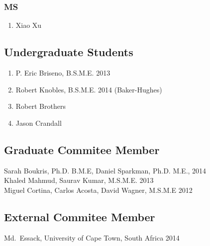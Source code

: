 \subsubsection*{MS}
\begin{enumerate}
  \item Xiao Xu
\end{enumerate}

\subsection*{Undergraduate Students}
  \begin{enumerate}
    \item P. Eric Briseno, B.S.M.E. 2013
    \item Robert Knobles, B.S.M.E. 2014 (Baker-Hughes)
    \item Robert Brothers
    \item Jason Crandall
  \end{enumerate}

\subsection*{Graduate Commitee Member}
Sarah Boukris, Ph.D. B.M.E, Daniel Sparkman, Ph.D. M.E., 2014 \\
Khaled Mahmud, Saurav Kumar, M.S.M.E. 2013 \\
Miguel Cortina, Carlos Acosta, David Wagner, M.S.M.E 2012 
\subsection*{External Commitee Member}
Md.~Essack, University of Cape Town, South Africa 2014


